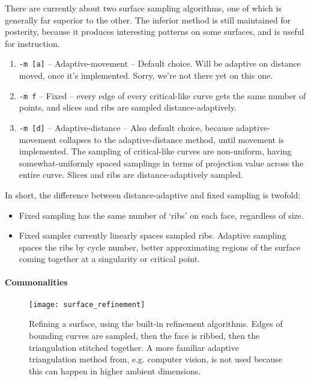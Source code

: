 There are currently about two surface sampling algorithms, one of which is generally far superior to the other.  The inferior method is still maintained for posterity, because it produces interesting patterns on some surfaces, and is useful for instruction. 

\begin{enumerate}
\item {\tt -m [a]} – Adaptive-movement – Default choice.  Will be adaptive on distance moved, once it's implemented.  Sorry, we're not there yet on this one.
\item {\tt -m f} – Fixed – every edge of every critical-like curve gets the same number of points, and slices and ribs are sampled distance-adaptively.
\item {\tt -m [d]} – Adaptive-distance – Also default choice, because adaptive-movement collapses to the adaptive-distance method, until movement is implemented.  The sampling of critical-like curves are non-uniform, having somewhat-uniformly spaced samplings in terms of projection value across the entire curve.  Slices and ribs are distance-adaptively sampled.

\end{enumerate}

In short, the difference between distance-adaptive and fixed sampling is twofold:
\begin{itemize}

  \item Fixed sampling has the same number of `ribs' on each face, regardless of size.

  \item Fixed sampler currently linearly spaces sampled ribs.  Adaptive sampling spaces the ribs by cycle number, better approximating regions of the surface coming together at a singularity or critical point.  

\end{itemize}


\paragraph*{Commonalities}

\begin{figure}[H]
\begin{center}
\texttt{[image: surface\_refinement]}
\caption[Surface refinement]{Refining a surface, using the built-in refinement algorithms.  Edges of bounding curves are sampled, then the face is ribbed, then the triangulation stitched together.  A more familiar adaptive triangulation method from, e.g. computer vision, is not used because this can happen in higher ambient dimensions.}
\end{center}
\end{figure}

